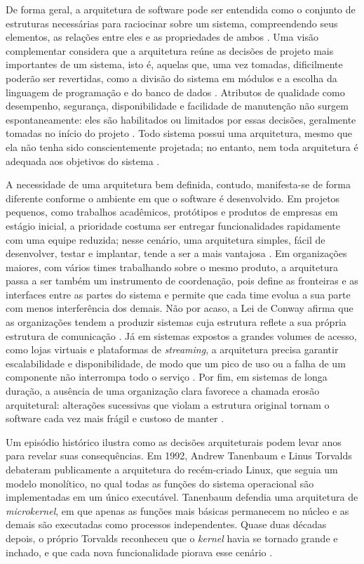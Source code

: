 \documentclass[12pt]{article}
\begin{document}
De forma geral, a arquitetura de software pode ser entendida como o conjunto de estruturas necessárias para raciocinar sobre um sistema, compreendendo seus elementos, as relações entre eles e as propriedades de ambos \cite{bass:2013}. Uma visão complementar considera que a arquitetura reúne as decisões de projeto mais importantes de um sistema, isto é, aquelas que, uma vez tomadas, dificilmente poderão ser revertidas, como a divisão do sistema em módulos e a escolha da linguagem de programação e do banco de dados \cite{valente:2020}. Atributos de qualidade como desempenho, segurança, disponibilidade e facilidade de manutenção não surgem espontaneamente: eles são habilitados ou limitados por essas decisões, geralmente tomadas no início do projeto \cite{bass:2013,cintra:2025}. Todo sistema possui uma arquitetura, mesmo que ela não tenha sido conscientemente projetada; no entanto, nem toda arquitetura é adequada aos objetivos do sistema \cite{bass:2013}.

A necessidade de uma arquitetura bem definida, contudo, manifesta-se de forma diferente conforme o ambiente em que o software é desenvolvido. Em projetos pequenos, como trabalhos acadêmicos, protótipos e produtos de empresas em estágio inicial, a prioridade costuma ser entregar funcionalidades rapidamente com uma equipe reduzida; nesse cenário, uma arquitetura simples, fácil de desenvolver, testar e implantar, tende a ser a mais vantajosa \cite{ciriano:2025}. Em organizações maiores, com vários times trabalhando sobre o mesmo produto, a arquitetura passa a ser também um instrumento de coordenação, pois define as fronteiras e as interfaces entre as partes do sistema e permite que cada time evolua a sua parte com menos interferência dos demais. Não por acaso, a Lei de Conway afirma que as organizações tendem a produzir sistemas cuja estrutura reflete a sua própria estrutura de comunicação \cite{conway:1968,valente:2020}. Já em sistemas expostos a grandes volumes de acesso, como lojas virtuais e plataformas de \textit{streaming}, a arquitetura precisa garantir escalabilidade e disponibilidade, de modo que um pico de uso ou a falha de um componente não interrompa todo o serviço \cite{newman:2015}. Por fim, em sistemas de longa duração, a ausência de uma organização clara favorece a chamada erosão arquitetural: alterações sucessivas que violam a estrutura original tornam o software cada vez mais frágil e custoso de manter \cite{perry:1992}.

Um episódio histórico ilustra como as decisões arquiteturais podem levar anos para revelar suas consequências. Em 1992, Andrew Tanenbaum e Linus Torvalds debateram publicamente a arquitetura do recém-criado Linux, que seguia um modelo monolítico, no qual todas as funções do sistema operacional são implementadas em um único executável. Tanenbaum defendia uma arquitetura de \textit{microkernel}, em que apenas as funções mais básicas permanecem no núcleo e as demais são executadas como processos independentes. Quase duas décadas depois, o próprio Torvalds reconheceu que o \textit{kernel} havia se tornado grande e inchado, e que cada nova funcionalidade piorava esse cenário \cite{valente:2020}.
\end{document}
